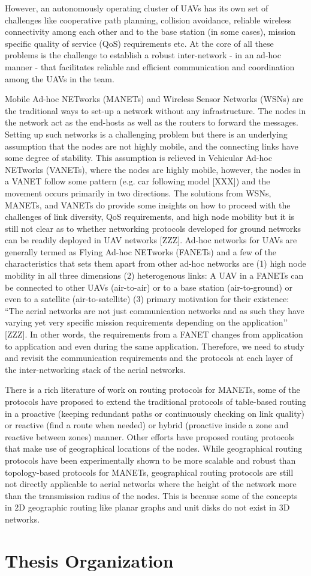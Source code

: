 However, an autonomously operating cluster of UAVs has its own set of challenges like cooperative path planning, collision avoidance, reliable wireless connectivity among each other and to the base station (in some cases), mission specific quality of service (QoS) requirements etc. At the core of all these problems is the challenge to establish a robust inter-network - in an ad-hoc manner - that facilitates reliable and efficient communication and coordination among the UAVs in the team. 

Mobile Ad-hoc NETworks (MANETs) and Wireless Sensor Networks (WSNs) are the traditional ways to set-up a network without any infrastructure. The nodes in the network act as the end-hosts as well as the routers to forward the messages. Setting up such networks is a challenging problem but there is an underlying assumption that the nodes are not highly mobile, and the connecting links have some degree of stability. This assumption is relieved in Vehicular Ad-hoc NETworks (VANETs), where the nodes are highly mobile, however, the nodes in a VANET follow some pattern (e.g. car following model [XXX]) and the movement occurs primarily in two directions. The solutions from WSNs, MANETs, and VANETs do provide some insights on how to proceed with the challenges of link diversity, QoS requirements, and high node mobility but it is still not clear as to whether networking protocols developed for ground networks can be readily deployed in UAV networks [ZZZ]. 
Ad-hoc networks for UAVs are generally termed as Flying Ad-hoc NETworks (FANETs) and a few of the characteristics that sets them apart from other ad-hoc networks are (1) high node mobility in all three dimensions (2) heterogenous links: A UAV in a FANETs can be connected to other UAVs (air-to-air) or to a base station (air-to-ground) or even to a satellite (air-to-satellite) (3) primary motivation for their existence: ``The aerial networks are not just communication networks and as such they have varying yet very specific mission requirements depending on the application’’ [ZZZ]. In other words, the requirements from a FANET changes from application to application and even during the same application. Therefore, we need to study and revisit the communication requirements and the protocols at each layer of the inter-networking stack of the aerial networks.

There is a rich literature of work on routing protocols for MANETs, some of the protocols have proposed to extend the traditional protocols of table-based routing in a proactive (keeping redundant paths or continuously checking on link quality) or reactive (find a route when needed) or hybrid (proactive inside a zone and reactive between zones) manner. Other efforts have proposed routing protocols that make use of geographical locations of the nodes. While geographical routing protocols have been experimentally shown to be more scalable and robust than topology-based protocols for MANETs, geographical routing protocols are still not directly applicable to aerial networks where the height of the network more than the transmission radius of the nodes. This is because some of the concepts in 2D geographic routing like planar graphs and unit disks do not exist in 3D networks.

\section{Thesis Organization}
